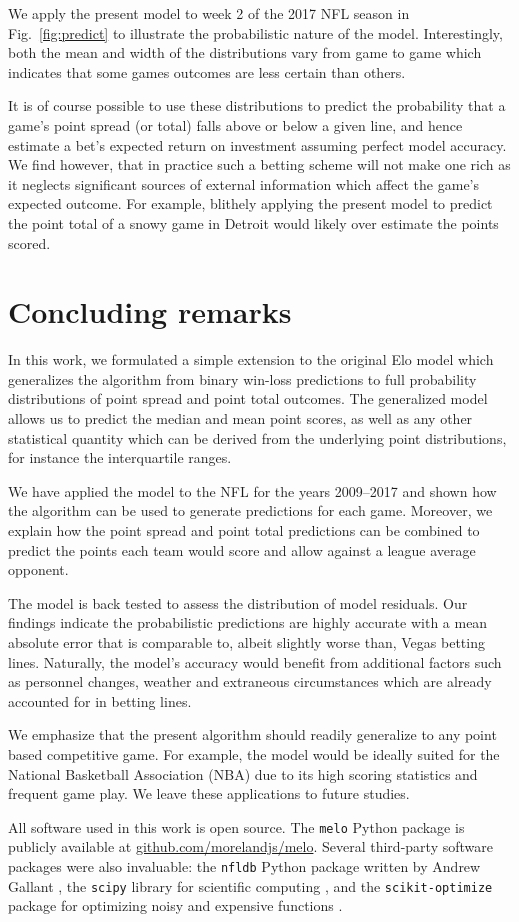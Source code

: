 \documentclass[aps,prc,reprint,amsmath,superscriptaddress,nofootinbib]{revtex4-1}
\begin{document}
We apply the present model to week 2 of the 2017 NFL season in Fig.~\ref{fig:predict} to illustrate the probabilistic nature of the model.
Interestingly, both the mean and width of the distributions vary from game to game which indicates that some games outcomes are less certain than others.

It is of course possible to use these distributions to predict the probability that a game's point spread (or total) falls above or below a given line, and hence estimate a bet's expected return on investment assuming perfect model accuracy.
We find however, that in practice such a betting scheme will not make one rich as it neglects significant sources of external information which affect the game's expected outcome.
For example, blithely applying the present model to predict the point total of a snowy game in Detroit would likely over estimate the points scored.

\section{Concluding remarks}

In this work, we formulated a simple extension to the original Elo model which generalizes the algorithm from binary win-loss predictions to full probability distributions of point spread and point total outcomes.
The generalized model allows us to predict the median and mean point scores, as well as any other statistical quantity which can be derived from the underlying point distributions, for instance the interquartile ranges. 

We have applied the model to the NFL for the years 2009--2017 and shown how the algorithm can be used to generate predictions for each game.
Moreover, we explain how the point spread and point total predictions can be combined to predict the points each team would score and allow against a league average opponent. 

The model is back tested to assess the distribution of model residuals.
Our findings indicate the probabilistic predictions are highly accurate with a mean absolute error that is comparable to, albeit slightly worse than, Vegas betting lines.
Naturally, the model's accuracy would benefit from additional factors such as personnel changes, weather and extraneous circumstances which are already accounted for in betting lines.

We emphasize that the present algorithm should readily generalize to any point based competitive game.
For example, the model would be ideally suited for the National Basketball Association (NBA) due to its high scoring statistics and frequent game play. 
We leave these applications to future studies.

\medskip

All software used in this work is open source.
The \texttt{melo} Python package is publicly available at \mbox{\url{github.com/morelandjs/melo}}.
Several third-party software packages were also invaluable: the \texttt{nfldb} Python package written by Andrew Gallant \cite{nfldb}, the \texttt{scipy} library for scientific computing \cite{scipy}, and the \texttt{scikit-optimize} package for optimizing noisy and expensive functions \cite{skopt}. 


\end{document}
